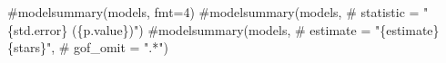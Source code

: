 \documentclass[
  letterpaper,
  DIV=11,
  numbers=noendperiod]{scrartcl}
\newenvironment{Shaded}{\begin{snugshade}}{\end{snugshade}}
\newcommand{\CommentTok}[1]{\textcolor[rgb]{0.38,0.43,0.53}{#1}}
\begin{document}
\begin{Shaded}
\begin{Highlighting}[]
\CommentTok{\#modelsummary(models, fmt=4)}
\CommentTok{\#modelsummary(models,}
 \CommentTok{\#            statistic = "\{std.error\} (\{p.value\})")}
\CommentTok{\#modelsummary(models,}
 \CommentTok{\#            estimate = "\{estimate\}\{stars\}",}
  \CommentTok{\#           gof\_omit = ".*")}
\end{Highlighting}
\end{Shaded}
\end{document}
